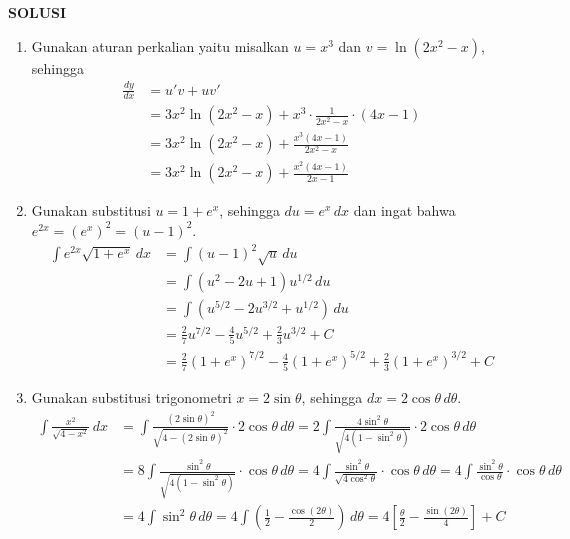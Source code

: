 \documentclass[11pt,openany,a4paper]{article}
\begin{document}
    \newpage
    \pagestyle{solution}
    {\centering\textbf{SOLUSI}}

    \begin{enumerate}
        \item Gunakan aturan perkalian yaitu misalkan $u = x^3$ dan $v = \ln(2x^2 - x)$, sehingga
        \begin{align*}
          \frac{dy}{dx} &= u'v + uv' \\
          &= 3x^2 \ln(2x^2 - x) + x^3 \cdot \frac{1}{2x^2 - x}\cdot(4x - 1) \\
          &= 3x^2 \ln(2x^2 - x) + \frac{x^3(4x - 1)}{2x^2 - x} \\
          &= \boxed{3x^2 \ln(2x^2 - x) + \frac{x^2(4x - 1)}{2x - 1}}
        \end{align*}
        \item Gunakan substitusi $u = 1 + e^x$, sehingga $du = e^x \, dx$ dan ingat bahwa $e^{2x} = (e^x)^2 = (u - 1)^2$. 
        \begin{align*}
          \int e^{2x} \sqrt{1 + e^x} \, dx &= \int (u - 1)^2 \sqrt{u} \, du \\
          &= \int (u^2 - 2u + 1)u^{1/2} \, du \\
          &= \int (u^{5/2} - 2u^{3/2} + u^{1/2}) \, du \\
          &= \frac{2}{7}u^{7/2} - \frac{4}{5}u^{5/2} + \frac{2}{3}u^{3/2} + C \\
          &= \boxed{\frac{2}{7}(1 + e^x)^{7/2} - \frac{4}{5}(1 + e^x)^{5/2} + \frac{2}{3}(1 + e^x)^{3/2} + C}
        \end{align*}
        \item Gunakan substitusi trigonometri $x = 2\sin\theta$, sehingga $dx = 2\cos\theta \, d\theta$.
        \begin{align*}
          \int \frac{x^2}{\sqrt{4 - x^2}} \, dx &= \int \frac{(2\sin\theta)^2}{\sqrt{4 - (2\sin\theta)^2}} \cdot 2\cos\theta \, d\theta 
          = 2\int \frac{4\sin^2\theta}{\sqrt{4(1 - \sin^2\theta)}} \cdot 2\cos\theta \, d\theta \\
          &= 8\int \frac{\sin^2\theta}{\sqrt{4(1 - \sin^2\theta)}} \cdot \cos\theta \, d\theta 
          = 4\int \frac{\sin^2\theta}{\sqrt{4\cos^2\theta}} \cdot \cos\theta \, d\theta 
          = 4\int \frac{\sin^2\theta}{\cos\theta} \cdot \cos\theta \, d\theta \\
          &= 4\int \sin^2\theta \, d\theta 
          = 4\int\left(\frac{1}{2}-\frac{\cos(2\theta)}{2}\right) \, d\theta 
          = 4\left[\frac{\theta}{2} - \frac{\sin(2\theta)}{4}\right] + C \\

\end{align*}
\end{enumerate}
\end{document}
